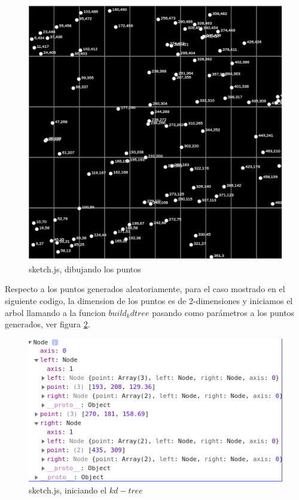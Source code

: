 \documentclass{article}
\begin{document}
		    \begin{figure}[H]
    			\centering
    			\includegraphics[scale=0.40]{img/sketch1.png}
    			\caption{sketch.js, dibujando los puntos}
    			\label{fig:sketch1}
    		\end{figure}
    		
    		Respecto a los puntos generados aleatoriamente, para el caso mostrado en el siguiente codigo, la dimension de los puntos es de 2-dimensiones y iniciamos el arbol llamando a la funcion $build_kdtree$ pasando como parámetros a los puntos generados, ver figura \ref{fig:sketch2}.
    		
    		\begin{figure}[H]
    			\centering
    			\includegraphics[scale=0.40]{img/sketch2.png}
    			\caption{sketch.js, iniciando el $kd-tree$}
    			\label{fig:sketch2}
    		\end{figure}
    		
\end{document}
